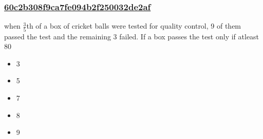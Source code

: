 \documentclass[]{beamer}
\begin{document}
\begin{frame}
    \frametitle{\underline{60c2b308f9ca7fe094b2f250032de2af}}
    when $\frac{3}{5}$th of a box of cricket balls were tested for quality control, 9 of them passed the test and the remaining 3 failed. If a box passes the test only if atleast 80%
    \begin{itemize}
        \item
            3
        \item
            5
        \item
            7
        \item
            8
        \item
            9
    \end{itemize}
\end{frame}
\end{document}
